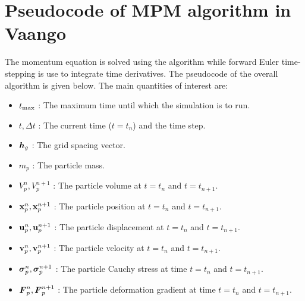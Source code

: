 \section{Pseudocode of MPM algorithm in Vaango}
The momentum equation is solved using the \MPM algorithm while forward Euler time-stepping
is use to integrate time derivatives.  The pseudocode of the overall algorithm is given below.
The main quantities of interest are:
\begin{itemize} 
  \setlength\itemsep{1pt}
  \item $t_{\text{max}}$ : {\Ochre The maximum time until which the simulation is to run.}
  \item $t, \Delta t$ : {\Ochre The current time ($t = t_n$) and the time step.}
  \item $\boldsymbol{h}_g$ : {\Ochre The grid spacing vector.}
  \item $m_p$ : {\Ochre The particle mass.}
  \item $V_p^n, V_p^{n+1}$ : {\Ochre The particle volume at $t = t_n$ and $t = t_{n+1}$.}
  \item $\mathbf{x}_p^n, \mathbf{x}_p^{n+1}$ : {\Ochre The particle position at $t = t_n$ and $t = t_{n+1}$.}
  \item $\mathbf{u}_p^n, \mathbf{u}_p^{n+1}$ : {\Ochre The particle displacement at $t = t_n$ and $t = t_{n+1}$.}
  \item $\mathbf{v}_p^n, \mathbf{v}_p^{n+1}$ : {\Ochre The particle velocity at $t = t_n$ and $t = t_{n+1}$.}
  \item $\boldsymbol{\sigma}_p^n, \boldsymbol{\sigma}_p^{n+1}$ : {\Ochre The particle Cauchy stress at time $t = t_n$ and $t = t_{n+1}$.}
  \item $\boldsymbol{F}_p^n, \boldsymbol{F}_p^{n+1}$ : {\Ochre The particle deformation gradient at time $t = t_n$ and $t = t_{n+1}$.}
\end{itemize}


